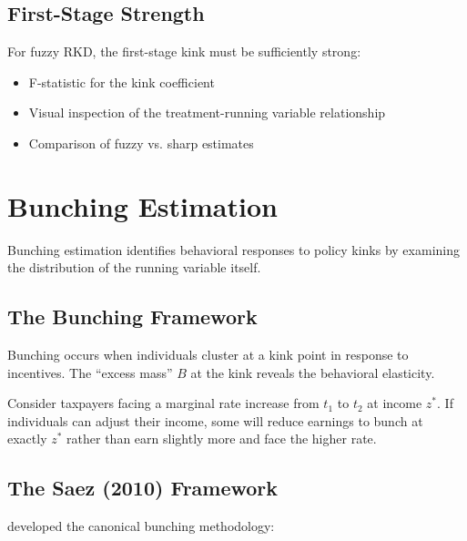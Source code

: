 \subsection{First-Stage Strength}

For fuzzy RKD, the first-stage kink must be sufficiently strong:

\begin{itemize}
    \item F-statistic for the kink coefficient
    \item Visual inspection of the treatment-running variable relationship
    \item Comparison of fuzzy vs. sharp estimates
\end{itemize}

\section{Bunching Estimation}
\label{sec:bunching}

Bunching estimation identifies behavioral responses to policy kinks by examining the distribution of the running variable itself.

\subsection{The Bunching Framework}

\begin{definition}[Bunching]
\label{def:bunching}
Bunching occurs when individuals cluster at a kink point in response to incentives. The ``excess mass'' $B$ at the kink reveals the behavioral elasticity.
\end{definition}

\begin{example}
Consider taxpayers facing a marginal rate increase from $t_1$ to $t_2$ at income $z^*$. If individuals can adjust their income, some will reduce earnings to bunch at exactly $z^*$ rather than earn slightly more and face the higher rate.
\end{example}

\subsection{The Saez (2010) Framework}

\citet{saez2010taxpayers} developed the canonical bunching methodology:

